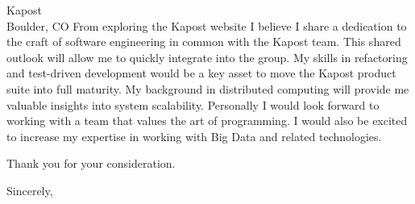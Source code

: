 \documentclass{letter}
\begin{document}
\begin{letter}{Kapost\\Boulder, CO}
From exploring the Kapost website I believe I share a dedication
to the craft of software engineering in common with the Kapost team.
This shared outlook will allow me to quickly integrate into the
group.  My skills in refactoring and test-driven development would
be a key asset to move the Kapost product suite into full maturity.
My background in distributed computing will provide me valuable
insights into system scalability.  Personally I would look forward
to working with a team that values the art of programming.  I would
also be excited to increase my expertise in working with Big Data
and related technologies.

Thank you for your consideration.

\closing{Sincerely,}
\end{letter}
\end{document}
